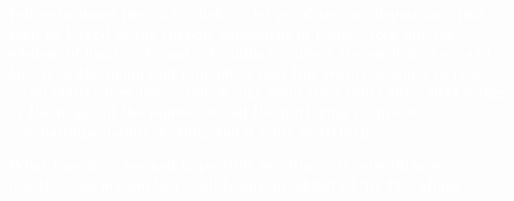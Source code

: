 \textbf{\textcolor{white}{Follow us down the rabbit hole --- let go of any predispositions that keep us locked in the current agreement of reality, seek out the wisdom of magic cats and caterpillars, explore the ancient caves and forests of the moon and remember that this reality is yours to create --- no matter how impossible it may seem from other side. 2022 brings us the magic of the number 6 and the nurturing nature of relationships, family, healing and a sense of HOME.}}

\textbf{\textcolor{white}{What may have seemed impossible for others, is something we, together can accomplish … all before breakfast at To The Moon.}}













\ifisflight
  \twocolumn
\fi

